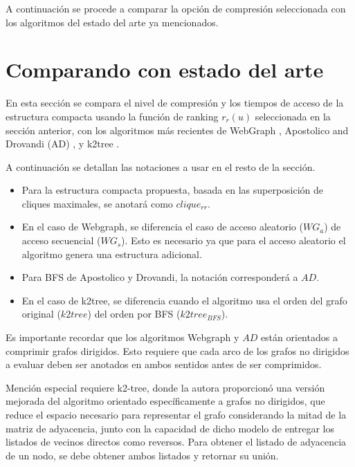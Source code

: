 

A continuación se procede a comparar la opción de compresión seleccionada con los algoritmos del estado del arte ya mencionados.




\section{Comparando con estado del arte}
En esta sección se compara el nivel de compresión y los tiempos de acceso de la estructura compacta usando la función de ranking $r_{r}(u)$ seleccionada en la sección anterior, con los algoritmos más recientes de WebGraph \cite{boldi2011layered}, Apostolico and Drovandi (AD) \cite{apostolico2009graph}, y k2tree \cite{brisaboa2014compact}.

A continuación se detallan las notaciones a usar en el resto de la sección.

\begin{itemize}
	\item Para la estructura compacta propuesta, basada en las superposición de cliques maximales, se anotará como $clique_{rr}$.
	\item En el caso de Webgraph, se diferencia el caso de acceso aleatorio ($WG_{a}$) de acceso secuencial ($WG_{s}$). Esto es necesario ya que para el acceso aleatorio el algoritmo genera una estructura adicional.
	\item Para BFS de Apostolico y Drovandi, la notación corresponderá a $AD$.
	\item En el caso de k2tree, se diferencia cuando el algoritmo usa el orden del grafo original ($k2tree$) del orden por BFS ($k2tree_{BFS}$).
\end{itemize}

Es importante recordar que los algoritmos Webgraph y $AD$ están orientados a comprimir grafos dirigidos. Esto requiere que cada arco de los grafos no dirigidos a evaluar deben ser anotados en ambos sentidos antes de ser comprimidos. 

Mención especial requiere k2-tree, donde la autora proporcionó una versión mejorada del algoritmo orientado específicamente a grafos no dirigidos, que reduce el espacio necesario para representar el grafo considerando la mitad de la matriz de adyacencia, junto con la capacidad de dicho modelo de entregar los listados de vecinos directos como reversos. Para obtener el listado de adyacencia de un nodo, se debe obtener ambos listados y retornar su unión.

